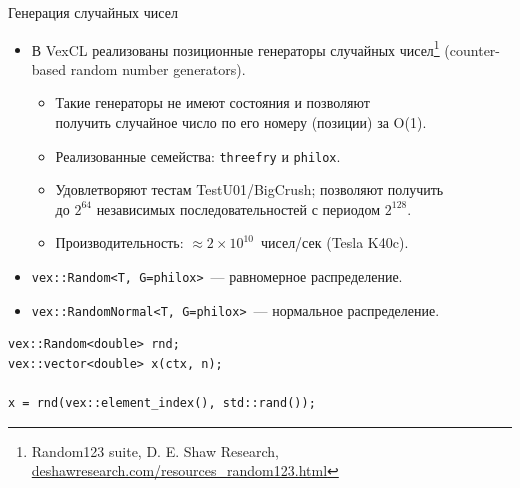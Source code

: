 \documentclass[@BEAMER_OPTIONS@]{beamer}
\newcommand{\code}[1]{\lstinline|#1|}
\begin{document}
\begin{frame}[fragile]{Генерация случайных чисел}
    \begin{itemize}
        \item В VexCL реализованы позиционные генераторы случайных
            чисел\footnote{Random123 suite, D. E. Shaw Research,
            \href{http://www.deshawresearch.com/resources\_random123.html}{deshawresearch.com/resources\_random123.html}}
            (counter-based random number generators).
            \begin{itemize}
                \item Такие генераторы не имеют состояния и позволяют\\
                    получить случайное число по его номеру (позиции) за O(1).
                \item Реализованные семейства: \code{threefry} и \code{philox}.
                \item Удовлетворяют тестам TestU01/BigCrush; позволяют
                    получить\\ до \alert{$2^{64}$} независимых
                    последовательностей с периодом \alert{$2^{128}$}.
                \item Производительность: \alert{$\approx
                    2\times10^{10}$}~чисел/сек (Tesla K40c).
            \end{itemize}
        \item \code{vex::Random<T, G=philox>}~--- равномерное распределение.
        \item \code{vex::RandomNormal<T, G=philox>}~--- нормальное распределение.
    \end{itemize}
    \begin{exampleblock}{}
        \begin{lstlisting}
vex::Random<double> rnd;
vex::vector<double> x(ctx, n);

x = rnd(vex::element_index(), std::rand());
        \end{lstlisting}
    \end{exampleblock}
\end{frame}

\end{document}
